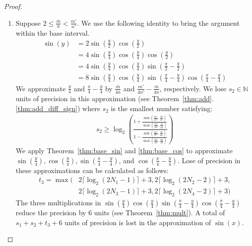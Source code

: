 \documentclass{article}
\newcommand{\nat}{\mathbb{N}}
\newcommand{\om}{\overline{m}}
\newcommand{\on}{\overline{n}}
\numberwithin{mytheorem}{section}
\begin{document}
\begin{proof}
\begin{enumerate}
\begin{align*}
t_2=\max(2\lceil\log_2(2N_1-1) \rceil+3,2\lceil\log_2(2N_2-2) \rceil+3)
\end{align*}
The multiplication in equality~\eqref{eqn:sin_id1} reduces the precision by $2$ units (see Theorem~\ref{thm:mult}). A total of $s_1+t_2+2$ units of precision is lost in the approximation of $\sin(x)$.
\item
Suppose $2\leq \frac{\om}{\on}<\frac{m'}{n'}$. We use the following identity to bring the argument within the base interval. 
\begin{align}
\sin(y)&=2\sin(\frac{y}{2})\cos(\frac{y}{2})\nonumber\\
&=4\sin(\frac{y}{4})\cos(\frac{y}{4})\cos(\frac{y}{2})\nonumber\\
&=4\sin(\frac{y}{4})\cos(\frac{y}{4})\sin(\frac{\pi}{2}-\frac{y}{2})\nonumber\\
&=8\sin(\frac{y}{4})\cos(\frac{y}{4})\sin(\frac{\pi}{4}-\frac{y}{4})\cos(\frac{\pi}{4}-\frac{y}{4})\label{eqn:sin_id2}
\end{align}
We approximate $\frac{y}{4}$ and $\frac{\pi}{4}-\frac{y}{4}$ by $\frac{\om}{4\on}$ and $\frac{m'}{4n'}-\frac{\om}{4\on}$, respectively. We lose $s_2\in \nat$ units of precision in this approximation (see Theorem~\ref{thm:add}.\ref{thm:add_diff_sign}) where $s_2$ is the smallest number satisfying:
\begin{align*}
s_2\geq \log_2(\frac{1+\frac{\min(\frac{m'}{4n'},\frac{\om}{4\on})}{\max(\frac{m'}{4n'},\frac{\om}{4\on})}}{1-\frac{\min(\frac{m'}{4n'},\frac{\om}{4\on})}{\max(\frac{m'}{4n'},\frac{\om}{4\on})}})
\end{align*}
We apply Theorem~\ref{thm:base_sin} and \ref{thm:base_cos} to approximate $\sin(\frac{y}{4}), \cos(\frac{y}{4}), \sin(\frac{\pi}{4}-\frac{y}{4})$, and $\cos(\frac{\pi}{4}-\frac{y}{4})$. Lose of precision in these approximations can be calculated as follows:
\begin{align*}
t_3=\max(&2\lceil\log_2(2N_1-1) \rceil+3,2\lceil\log_2(2N_2-2) \rceil+3,\\
&2\lceil\log_2(2N_3-1) \rceil+3,2\lceil\log_2(2N_4-2) \rceil+3)
\end{align*}
The three multiplications in $\sin(\frac{y}{4})\cos(\frac{y}{4})\sin(\frac{\pi}{4}-\frac{y}{4})\cos(\frac{\pi}{4}-\frac{y}{4})$ reduce the precision by $6$ units (see Theorem~\ref{thm:mult}). A total of $s_1+s_2+t_3+6$ units of precision is lost in the approximation of $\sin(x)$.
\end{enumerate}
\end{proof}
\end{document}
